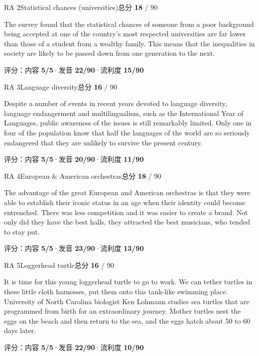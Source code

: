 \documentclass[11pt]{article}
\newcommand{\sfull}[1]{\textcolor{cFix}{\bfseries #1}}     %
\newcommand{\spart}[1]{\textcolor{cPartial}{\bfseries #1}} %
\newcommand{\szero}[1]{\textcolor{cWrong}{\bfseries #1}}   %
\begin{document}
\begin{qblock}{RA 2\quad Statistical chances (universities)}{总分 \textcolor{cAccent}{\bfseries 18} / 90}
\begin{promptbox}
The survey found that the statistical chances of someone from a poor background being accepted at one of the country's most respected universities are far lower than those of a student from a wealthy family. This means that the inequalities in society are likely to be passed down from one generation to the next.
\end{promptbox}
{\small 评分：内容 \sfull{5/5}\quad·\quad 发音 \spart{22/90}\quad·\quad 流利度 \szero{15/90}}
\end{qblock}

\begin{qblock}{RA 3\quad Language diversity}{总分 \textcolor{cAccent}{\bfseries 16} / 90}
\begin{promptbox}
Despite a number of events in recent years devoted to language diversity, language endangerment and multilingualism, such as the International Year of Languages, public awareness of the issues is still remarkably limited. Only one in four of the population know that half the languages of the world are so seriously endangered that they are unlikely to survive the present century.
\end{promptbox}
{\small 评分：内容 \sfull{5/5}\quad·\quad 发音 \spart{20/90}\quad·\quad 流利度 \szero{11/90}}
\end{qblock}

\begin{qblock}{RA 4\quad European \& American orchestras}{总分 \textcolor{cAccent}{\bfseries 18} / 90}
\begin{promptbox}
The advantage of the great European and American orchestras is that they were able to establish their iconic status in an age when their identity could become entrenched. There was less competition and it was easier to create a brand. Not only did they have the best halls, they attracted the best musicians, who tended to stay put.
\end{promptbox}
{\small 评分：内容 \sfull{5/5}\quad·\quad 发音 \spart{23/90}\quad·\quad 流利度 \szero{13/90}}
\end{qblock}

\begin{qblock}{RA 5\quad Loggerhead turtle}{总分 \textcolor{cAccent}{\bfseries 16} / 90}
\begin{promptbox}
It is time for this young loggerhead turtle to go to work. We can tether turtles in these little cloth harnesses, put them onto this tank-like swimming place. University of North Carolina biologist Ken Lohmann studies sea turtles that are programmed from birth for an extraordinary journey. Mother turtles nest the eggs on the beach and then return to the sea, and the eggs hatch about 50 to 60 days later.
\end{promptbox}
{\small 评分：内容 \sfull{5/5}\quad·\quad 发音 \spart{22/90}\quad·\quad 流利度 \szero{10/90}}
\end{qblock}
\end{document}
